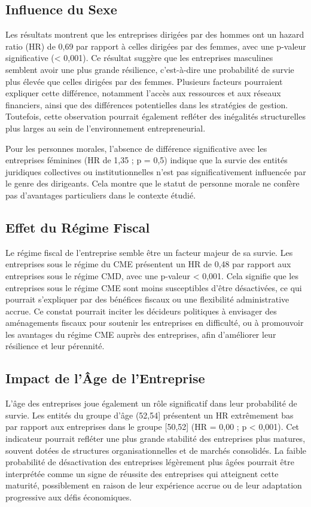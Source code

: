 \documentclass[a4paper,12pt]{report}
\begin{document}
\subsection{Influence du Sexe}
Les résultats montrent que les entreprises dirigées par des hommes ont un hazard ratio (HR) de 0,69 par rapport à celles dirigées par des femmes, avec une p-valeur significative (< 0,001). Ce résultat suggère que les entreprises masculines semblent avoir une plus grande résilience, c’est-à-dire une probabilité de survie plus élevée que celles dirigées par des femmes. Plusieurs facteurs pourraient expliquer cette différence, notamment l'accès aux ressources et aux réseaux financiers, ainsi que des différences potentielles dans les stratégies de gestion. Toutefois, cette observation pourrait également refléter des inégalités structurelles plus larges au sein de l'environnement entrepreneurial.

Pour les personnes morales, l'absence de différence significative avec les entreprises féminines (HR de 1,35 ; p = 0,5) indique que la survie des entités juridiques collectives ou institutionnelles n’est pas significativement influencée par le genre des dirigeants. Cela montre que le statut de personne morale ne confère pas d’avantages particuliers dans le contexte étudié.

\subsection{Effet du Régime Fiscal}
Le régime fiscal de l'entreprise semble être un facteur majeur de sa survie. Les entreprises sous le régime du CME présentent un HR de 0,48 par rapport aux entreprises sous le régime CMD, avec une p-valeur < 0,001. Cela signifie que les entreprises sous le régime CME sont moins susceptibles d'être désactivées, ce qui pourrait s'expliquer par des bénéfices fiscaux ou une flexibilité administrative accrue. Ce constat pourrait inciter les décideurs politiques à envisager des aménagements fiscaux pour soutenir les entreprises en difficulté, ou à promouvoir les avantages du régime CME auprès des entreprises, afin d’améliorer leur résilience et leur pérennité.

\subsection{Impact de l'Âge de l'Entreprise}
L'âge des entreprises joue également un rôle significatif dans leur probabilité de survie. Les entités du groupe d'âge (52,54] présentent un HR extrêmement bas par rapport aux entreprises dans le groupe [50,52] (HR = 0,00 ; p < 0,001). Cet indicateur pourrait refléter une plus grande stabilité des entreprises plus matures, souvent dotées de structures organisationnelles et de marchés consolidés. La faible probabilité de désactivation des entreprises légèrement plus âgées pourrait être interprétée comme un signe de réussite des entreprises qui atteignent cette maturité, possiblement en raison de leur expérience accrue ou de leur adaptation progressive aux défis économiques.
\end{document}
